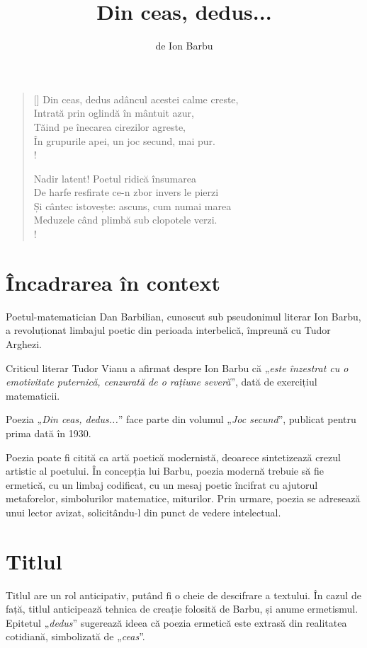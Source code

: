 \documentclass{article}
\title{Din ceas, dedus...}
\author{de Ion Barbu}
\date{}
\newcommand{\qu}[1]{„\emph{#1}”}
\begin{document}
\maketitle

\settowidth{\versewidth}{Și cântec istovește: ascuns, cum numai marea}
\begin{verse}[\versewidth]
Din ceas, dedus adâncul acestei calme creste, \\
Intrată prin oglindă în mântuit azur, \\
Tăind pe înecarea cirezilor agreste, \\
În grupurile apei, un joc secund, mai pur. \\!

Nadir latent! Poetul ridică însumarea \\
De harfe resfirate ce-n zbor invers le pierzi \\
Și cântec istovește: ascuns, cum numai marea \\
Meduzele când plimbă sub clopotele verzi. \\!
\end{verse}

\section{Încadrarea în context}
Poetul-matematician Dan Barbilian, cunoscut sub pseudonimul literar Ion Barbu, a revoluționat limbajul poetic din perioada interbelică, împreună cu Tudor Arghezi.

Criticul literar Tudor Vianu a afirmat despre Ion Barbu că \qu{este înzestrat cu o emotivitate puternică, cenzurată de o rațiune severă}, dată de exercițiul matematicii.

Poezia \qu{Din ceas, dedus...} face parte din volumul \qu{Joc secund}, publicat pentru prima dată în 1930.

Poezia poate fi citită ca artă poetică modernistă, deoarece sintetizează crezul artistic al poetului. În concepția lui Barbu, poezia modernă trebuie să fie ermetică, cu un limbaj codificat, cu un mesaj poetic încifrat cu ajutorul metaforelor, simbolurilor matematice, miturilor. Prin urmare, poezia se adresează unui lector avizat, solicitându-l din punct de vedere intelectual.

\section{Titlul}
Titlul are un rol anticipativ, putând fi o cheie de descifrare a textului. În cazul de față, titlul anticipează tehnica de creație folosită de Barbu, și anume ermetismul. Epitetul \qu{dedus} sugerează ideea că poezia ermetică este extrasă din realitatea cotidiană, simbolizată de \qu{ceas}.
\end{document}
